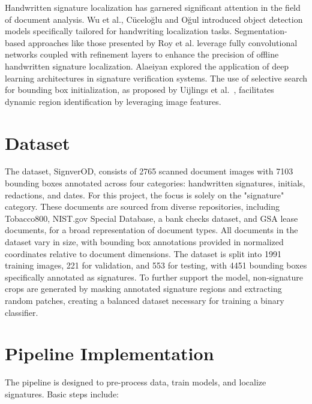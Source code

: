 \documentclass[a4paper,12pt]{article}
\begin{document}
Handwritten signature localization has garnered significant attention in the field of document analysis. Wu et al.\cite{wu2021}, Cüceloğlu and Oğul\cite{cuceloglu2018} introduced object detection models specifically tailored for handwriting localization tasks. Segmentation-based approaches like those presented by Roy et al.\cite{roy2020} leverage fully convolutional networks coupled with refinement layers to enhance the precision of offline handwritten signature localization. Alaeiyan\cite{alaeiyan2022} explored the application of deep learning architectures in signature verification systems. The use of selective search for bounding box initialization, as proposed by Uijlings et al.~\cite{victor2013}, facilitates dynamic region identification by leveraging image features.

\section{Dataset}
The dataset, SignverOD, consists of 2765 scanned document images with 7103 bounding boxes annotated across four categories: handwritten signatures, initials, redactions, and dates. For this project, the focus is solely on the "signature" category. These documents are sourced from diverse repositories, including Tobacco800, NIST.gov Special Database, a bank checks dataset, and GSA lease documents, for a broad representation of document types. All documents in the dataset vary in size, with bounding box annotations provided in normalized coordinates relative to document dimensions. The dataset is split into 1991 training images, 221 for validation, and 553 for testing, with 4451 bounding boxes specifically annotated as signatures. To further support the model, non-signature crops are generated by masking annotated signature regions and extracting random patches, creating a balanced dataset necessary for training a binary classifier.

\section{Pipeline Implementation}
The pipeline is designed to pre-process data, train models, and localize signatures. Basic steps include:
\end{document}

